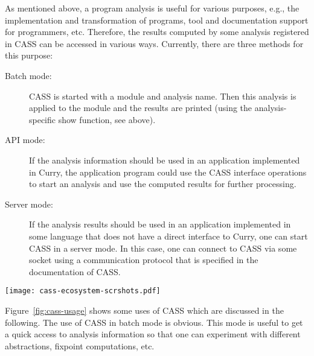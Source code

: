 \documentclass{llncs}
\begin{document}
As mentioned above, a program analysis
is useful for various purposes, e.g., the implementation
and transformation of programs, tool and documentation support
for programmers, etc.
Therefore, the results computed by some analysis registered
in CASS can be accessed in various ways.
Currently, there are three methods for this purpose:
\begin{description}
\item[Batch mode:]
CASS is started with a module and analysis name.
Then this analysis is applied to the module and the
results are printed (using the analysis-specific show function, see above).
\item[API mode:]
If the analysis information should be used in an application
implemented in Curry, the application program could use the CASS interface
operations to start an analysis and use the computed results
for further processing.
\item[Server mode:]
If the analysis results should be used in an application
implemented in some language that does not have a direct interface to Curry,
one can start CASS in a server mode. In this case, one can connect to
CASS via some socket using a communication protocol that is specified
in the documentation of CASS.
\end{description}
\begin{figure*}[t]
\begin{center}
\texttt{[image: cass-ecosystem-scrshots.pdf]}
\end{center}
\caption{Using CASS in different contexts\label{fig:cass-usage}}
\end{figure*}
Figure~\ref{fig:cass-usage} shows some uses of CASS
which are discussed in the following.
The use of CASS in batch mode is obvious.
This mode is useful to get a quick access to analysis information
so that one can experiment with different abstractions,
fixpoint computations, etc.
\end{document}
